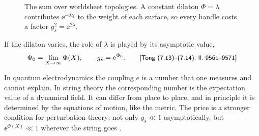 \begin{figure}[ht]
\centering
{}
\caption{The sum over worldsheet topologies. A constant dilaton $\Phi=\lambda$ contributes
$\ee^{-\lambda\chi}$ to the weight of each surface, so every handle costs a factor
$g_s^2=\ee^{2\lambda}$.}
\label{fig:backgrounds:genus}
\end{figure}

If the dilaton varies, the role of $\lambda$ is played by its asymptotic value,
\begin{equation}\label{eq:backgrounds:gs}
  \Phi_0=\lim_{X\to\infty}\Phi(X),\qquad g_s=\mathrm{e}^{\Phi_0}.
  \qquad\text{{\small\textsf{[Tong (7.13)--(7.14), ll.~9561--9571]}}}
\end{equation}

\begin{physicsbox}
In quantum electrodynamics the coupling $e$ is a number that one measures and cannot explain.
In string theory the corresponding number is the expectation value of a dynamical field. It
can differ from place to place, and in principle it is determined by the equations of
motion, like the metric. The price is a stronger condition for perturbation theory: not only
$g_s\ll1$ asymptotically, but $\ee^{\Phi(X)}\ll1$ wherever the string goes
.
\end{physicsbox}

